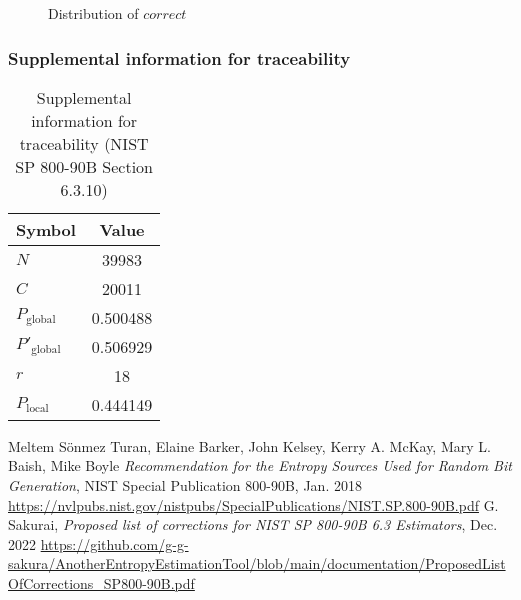 \documentclass[a3paper,xelatex,english]{bxjsarticle}
\begin{document}
\begin{figure}[htbp]
\centering

\caption{Distribution of $correct$}
\end{figure}
\subsubsection{Supplemental information for traceability}
\renewcommand{\arraystretch}{1.8}
\begin{table}[h]
\caption{Supplemental information for traceability (NIST SP 800-90B Section 6.3.10)}
\begin{center}
\begin{tabular}{|l|c|}
\hline 
\rowcolor{anotherlightblue} %
Symbol				& Value \\ \hline 
$N$				& 39983\\ \hline 
$C$				& 20011\\ \hline 
$P_{\textrm{global}}$				& 0.500488\\ \hline 
$P'_{\textrm{global}}$			& 0.506929\\ \hline 
$r$				& 18\\ \hline 
$P_{\textrm{local}}$ 			& 0.444149\\ \hline
\end{tabular}
\end{center}
\end{table}
\renewcommand{\arraystretch}{1.4}
\begin{thebibliography}{99}
Meltem S\"{o}nmez Turan,
Elaine Barker,
John Kelsey,
Kerry A. McKay,
Mary L. Baish,
Mike Boyle
\textit{Recommendation for the Entropy Sources Used for Random Bit Generation},
NIST Special Publication 800-90B, Jan. 2018 
\url{https://nvlpubs.nist.gov/nistpubs/SpecialPublications/NIST.SP.800-90B.pdf}
G. Sakurai, \textit{Proposed list of corrections for NIST SP 800-90B 6.3 Estimators}, Dec. 2022 
\url{https://github.com/g-g-sakura/AnotherEntropyEstimationTool/blob/main/documentation/ProposedListOfCorrections_SP800-90B.pdf}
\end{thebibliography}
\end{document}
